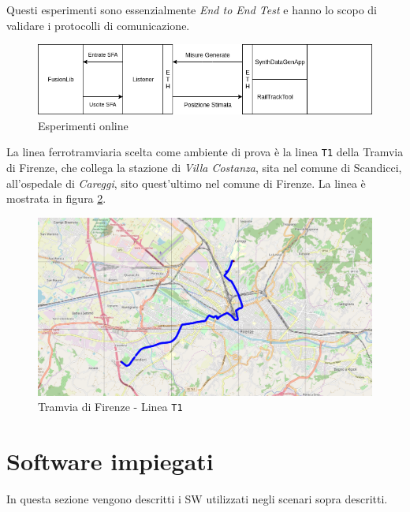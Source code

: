 \begin{itemize}
	Questi esperimenti sono essenzialmente \emph{End to End Test} e hanno lo scopo di validare i protocolli di comunicazione.
	\begin{figure}[h]
	\centering
	\includegraphics[width=\linewidth]{img/onlinetest}
	\caption{Esperimenti online}
	\label{fig:online}
\end{figure}
\end{itemize}
La linea ferrotramviaria scelta come ambiente di prova \`e la linea \texttt{T1} della Tramvia di Firenze, che collega la stazione di \emph{Villa Costanza}, sita nel comune di Scandicci, all'ospedale di \emph{Careggi}, sito quest'ultimo nel comune di Firenze. La linea \`e mostrata in figura \ref{fig:t1}.\newpage
\begin{figure}[h]
	\centering
	\includegraphics[width=\linewidth]{img/t1}
	\caption{Tramvia di Firenze - Linea \texttt{T1}}
	\label{fig:t1}
\end{figure}

\section{Software impiegati}
In questa sezione vengono descritti i SW utilizzati negli scenari sopra descritti.
